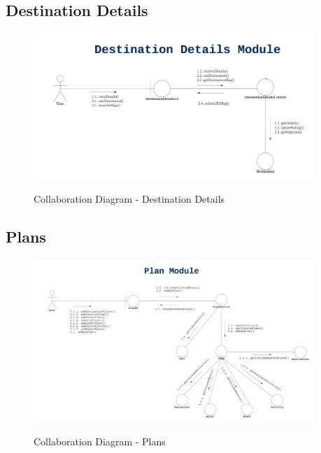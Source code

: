 \documentclass[12pt]{article}
\begin{document}
\subsection{Destination Details}
\begin{figure}[H]
    \centering
        \includegraphics[width=0.95\textwidth]{Collaboration Diagram/Destination Details.png}
        \label{fig:CollabDestDetails}
    \caption{Collaboration Diagram - Destination Details}
\end{figure}

\newpage
\subsection{Plans}
\begin{figure}[H]
    \centering
        \includegraphics[width=0.95\textwidth]{Collaboration Diagram/Plans.png}
        \label{fig:CollabPlans}
    \caption{Collaboration Diagram - Plans}
\end{figure}
\end{document}
